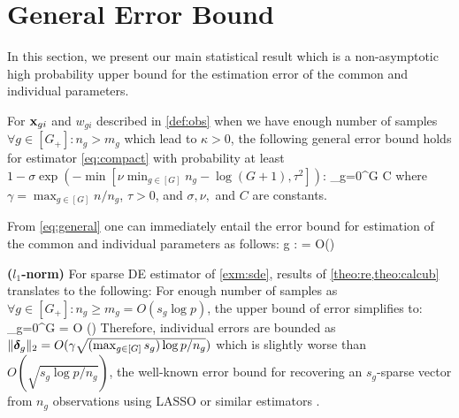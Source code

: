 \section{General Error Bound}
\label{sec:error}
In this section, we present our main statistical result which is a non-asymptotic high probability upper bound for the estimation error of the common and individual parameters.
\begin{theorem}
	\label{theo:calcub}
	For $\mathbf{x}_{gi}$ and $w_{gi}$ described in \cref{def:obs} when we have enough number of samples $\forall g \in [G_+]: n_g > m_g$ which lead to $\kappa > 0$, the following general error bound holds for estimator \cref{eq:compact} with probability at least $1 - \sigma \exp\left(-\min\left[\nu  \min_{g \in [G]} n_g - \log (G+1), \tau^2\right]\right) $: 
	\be
	\label{eq:general}
	\sum_{g=0}^{G}  
	\leq C {\gamma} 
	\ee
	where $\gamma = \max_{g \in [G]} n/n_g$, $\tau > 0$, and $\sigma, \nu,$ and $C$ are constants. 
\end{theorem}

\begin{corollary}
	\label{corr:single}
	From \cref{eq:general} one can immediately entail the error bound for estimation of the common and individual parameters as follows:
	\be
	\nr
	\forall g \in [G_+]: \quad {} =  O\left(\gamma {}\right)
	\ee
\end{corollary}

\begin{example}
	{\bf ($l_1$-norm)} For sparse DE estimator of \cref{exm:sde}, results of \cref{theo:re,theo:calcub} translates to the following: For enough number of samples as $\forall g \in [G_+]: n_g \geq m_g = O(s_g \log p)$, the upper bound of error simplifies to:
	\be
	\sum_{g=0}^{G}  	= O \left(\gamma {}\right) 
	\ee 
	Therefore, individual errors are bounded as $\|\boldsymbol{\delta}_g\|_{2}	= O (\gamma \sqrt{(\max_{g \in [G]}  s_g)\log p/n_g})$
	which is slightly worse than $O(\sqrt{s_g\log p/n_g})$, the well-known error bound for recovering an $s_g$-sparse vector from $n_g$ observations using LASSO or similar estimators \cite{banerjee14, bickel2009simultaneous, candes2007dantzig, venkat12, chatterjee2014generalized}. 
\end{example}

